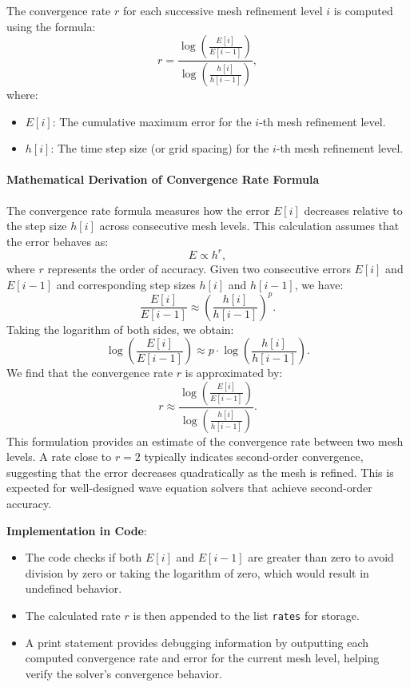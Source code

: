 \documentclass{article}
\begin{document}
			The convergence rate \( r \) for each successive mesh refinement level \( i \) is computed using the formula:
			\[
			r = \frac{\log \left( \frac{E[i]}{E[i - 1]} \right)}{\log \left( \frac{h[i]}{h[i - 1]} \right)},
			\]
			where:
			\begin{itemize}
				\item \( E[i] \): The cumulative maximum error for the \( i \)-th mesh refinement level.
				\item \( h[i] \): The time step size (or grid spacing) for the \( i \)-th mesh refinement level.
			\end{itemize}
			
			\paragraph{Mathematical Derivation of Convergence Rate Formula}
			
			The convergence rate formula measures how the error \( E[i] \) decreases relative to the step size \( h[i] \) across consecutive mesh levels. This calculation assumes that the error behaves as:
			\[
			E \propto h^r,
			\]
			where \(r \) represents the order of accuracy. Given two consecutive errors \( E[i] \) and \( E[i-1] \) and corresponding step sizes \( h[i] \) and \( h[i-1] \), we have:
			\[
			\frac{E[i]}{E[i-1]} \approx \left( \frac{h[i]}{h[i-1]} \right)^p.
			\]
			Taking the logarithm of both sides, we obtain:
			\[
			\log \left( \frac{E[i]}{E[i-1]} \right) \approx p \cdot \log \left( \frac{h[i]}{h[i-1]} \right).
			\]
			We find that the convergence rate \( r \) is approximated by:
			\[
			r \approx \frac{\log \left( \frac{E[i]}{E[i-1]} \right)}{\log \left( \frac{h[i]}{h[i-1]} \right)}.
			\]
			This formulation provides an estimate of the convergence rate between two mesh levels. A rate close to \( r = 2 \) typically indicates second-order convergence, suggesting that the error decreases quadratically as the mesh is refined. This is expected for well-designed wave equation solvers that achieve second-order accuracy.
			
			\textbf{Implementation in Code}:
			\begin{itemize}
				\item The code checks if both \( E[i] \) and \( E[i - 1] \) are greater than zero to avoid division by zero or taking the logarithm of zero, which would result in undefined behavior.
				\item The calculated rate \( r \) is then appended to the list \texttt{rates} for storage.
				\item A print statement provides debugging information by outputting each computed convergence rate and error for the current mesh level, helping verify the solver's convergence behavior.
			\end{itemize}
			
\end{document}
